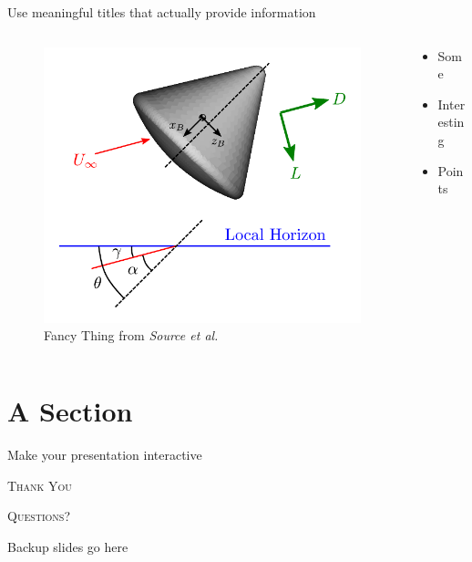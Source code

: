 \documentclass{cubeamer}
\begin{document}
\begin{frame}{Use meaningful titles that actually provide information}
    \begin{columns}
        \begin{column}{0.6\textwidth}
            \begin{figure}
                \centering
                \includegraphics[height = 0.7\textheight]{img/example.pdf}
                \caption{Fancy Thing from \textit{Source et al.}}
            \end{figure}
        \end{column}
        \begin{column}{0.4\textwidth}
            \begin{itemize}
                \item Some
                \item Interesting
                \item Points
            \end{itemize}
        \end{column}
    \end{columns}
\end{frame}

\section{A Section}

\begin{frame}{Make your presentation interactive}
    \begin{cublock}
        \begin{overlayarea}{\textwidth}{\baselineskip}
        \end{overlayarea}
    \end{cublock}
\end{frame}

\begin{frame}[standout]
    \Huge\textsc{Thank You}
    
    \vfill
    
    \LARGE\textsc{Questions?}
\end{frame}

\appendix

\begin{frame}{Backup slides go here}
    
\end{frame}
\end{document}
